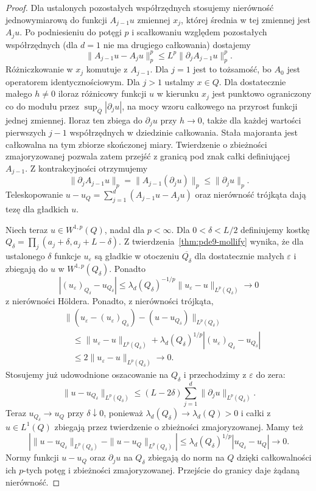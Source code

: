 \begin{proof}
Dla ustalonych pozostałych współrzędnych stosujemy
nierówność jednowymiarową do funkcji $A_{j-1}u$
zmiennej $x_j$, której średnia w tej zmiennej jest
$A_ju$. Po podniesieniu do potęgi $p$ i scałkowaniu
względem pozostałych współrzędnych (dla $d=1$
nie ma drugiego całkowania) dostajemy
\[
 \|A_{j-1}u-A_ju\|_p^p
 \le L^p\|\partial_j A_{j-1}u\|_p^p.
\]
Różniczkowanie w $x_j$ komutuje z $A_{j-1}$.
Dla $j=1$ jest to tożsamość, bo $A_0$ jest
operatorem identycznościowym. Dla $j>1$ ustalmy
$x\in Q$. Dla dostatecznie małego $h\ne0$ iloraz
różnicowy funkcji $u$ w kierunku $x_j$ jest
punktowo ograniczony co do modułu przez
$\sup_{\overline Q}|\partial_j u|$, na mocy wzoru
całkowego na przyrost funkcji jednej zmiennej.
Iloraz ten zbiega do $\partial_j u$ przy $h\to0$,
także dla każdej wartości pierwszych $j-1$
współrzędnych w dziedzinie całkowania.
Stała majoranta jest całkowalna na tym zbiorze
skończonej miary. Twierdzenie o zbieżności
zmajoryzowanej pozwala zatem przejść z granicą
pod znak całki definiującej $A_{j-1}$.
Z kontrakcyjności otrzymujemy
\[
 \|\partial_j A_{j-1}u\|_p
 =\|A_{j-1}(\partial_j u)\|_p\le\|\partial_j u\|_p.
\]
Teleskopowanie $u-u_Q=\sum_{j=1}^d(A_{j-1}u-A_ju)$
oraz nierówność trójkąta dają tezę dla gładkich $u$.

Niech teraz $u\in W^{1,p}(Q)$, nadal dla $p<\infty$.
Dla $0<\delta<L/2$ definiujemy kostkę
$Q_\delta=\prod_j(a_j+\delta,a_j+L-\delta)$.
Z twierdzenia~\ref{thm:pde9-mollify} wynika, że
dla ustalonego $\delta$ funkcje $u_\varepsilon$ są
gładkie w otoczeniu $\overline{Q_\delta}$ dla
dostatecznie małych $\varepsilon$ i zbiegają do $u$
w $W^{1,p}(Q_\delta)$. Ponadto
\[
 |(u_\varepsilon)_{Q_\delta}-u_{Q_\delta}|
 \le\lambda_d(Q_\delta)^{-1/p}
      \|u_\varepsilon-u\|_{L^p(Q_\delta)}\to0
\]
z nierówności Höldera. Ponadto, z nierówności trójkąta,
\[
 \begin{aligned}
 &\|(u_\varepsilon-(u_\varepsilon)_{Q_\delta})
 -(u-u_{Q_\delta})\|_{L^p(Q_\delta)}\\
 &\quad\le \|u_\varepsilon-u\|_{L^p(Q_\delta)}
 +\lambda_d(Q_\delta)^{1/p}
 |(u_\varepsilon)_{Q_\delta}-u_{Q_\delta}|\\
 &\quad\le 2\|u_\varepsilon-u\|_{L^p(Q_\delta)}
 \longrightarrow0.
 \end{aligned}
\]
Stosujemy już udowodnione oszacowanie na $Q_\delta$
i przechodzimy z $\varepsilon$ do zera:
\[
 \|u-u_{Q_\delta}\|_{L^p(Q_\delta)}
 \le (L-2\delta)\sum_{j=1}^d\|\partial_j u\|_{L^p(Q_\delta)}.
\]
Teraz $u_{Q_\delta}\to u_Q$ przy $\delta\downarrow0$,
ponieważ $\lambda_d(Q_\delta)\to\lambda_d(Q)>0$
i całki z $u\in L^1(Q)$ zbiegają przez twierdzenie
o zbieżności zmajoryzowanej. Mamy też
\[
 \left|\|u-u_{Q_\delta}\|_{L^p(Q_\delta)}
       -\|u-u_Q\|_{L^p(Q_\delta)}\right|
 \le\lambda_d(Q_\delta)^{1/p}|u_{Q_\delta}-u_Q|\to0.
\]
Normy funkcji $u-u_Q$ oraz $\partial_j u$ na
$Q_\delta$ zbiegają do norm na $Q$ dzięki całkowalności
ich $p$-tych potęg i zbieżności zmajoryzowanej.
Przejście do granicy daje żądaną nierówność.


\end{proof}
